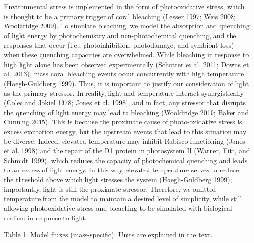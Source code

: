 \documentclass[]{elsarticle} %
\begin{document}
Environmental stress is implemented in the form of photooxidative
stress, which is thought to be a primary trigger of coral bleaching
(Lesser 1997; Weis 2008; Wooldridge 2009). To simulate bleaching, we
model the absorption and quenching of light energy by photochemistry and
non-photochemical quenching, and the responses that occur (i.e.,
photoinhibition, photodamage, and symbiont loss) when these quenching
capacities are overwhelmed. While bleaching in response to high light
alone has been observed experimentally (Schutter et al. 2011; Downs et
al. 2013), mass coral bleaching events occur concurrently with high
temperature (Hoegh-Guldberg 1999). Thus, it is important to justify our
consideration of light as the primary stressor. In reality, light and
temperature interact synergistically (Coles and Jokiel 1978; Jones et
al. 1998), and in fact, any stressor that disrupts the quenching of
light energy may lead to bleaching (Wooldridge 2010; Baker and Cunning
2015). This is because the proximate cause of photo-oxidative stress is
excess excitation energy, but the upstream events that lead to this
situation may be diverse. Indeed, elevated temperature may inhibit
Rubisco functioning (Jones et al. 1998) and the repair of the D1 protein
in photosystem II (Warner, Fitt, and Schmidt 1999), which reduces the
capacity of photochemical quenching and leads to an excess of light
energy. In this way, elevated temperature serves to reduce the threshold
above which light stresses the system (Hoegh-Guldberg 1999);
importantly, light is still the proximate stressor. Therefore, we
omitted temperature from the model to maintain a desired level of
simplicity, while still allowing photooxidative stress and bleaching to
be simulated with biological realism in response to light.

Table 1. Model fluxes (mass-specific). Units are explained in the text.
\end{document}
